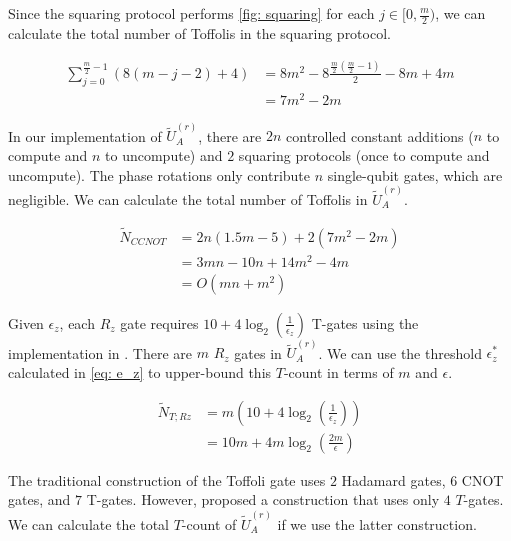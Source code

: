 Since the squaring protocol performs \ref{fig: squaring} for each $j \in [0, \frac{m}{2})$, we can calculate the total number of Toffolis in the squaring protocol.

\begin{equation}
    \begin{split}
        \sum_{j = 0}^{\frac{m}{2} - 1} (8(m - j - 2) + 4) &= 8m^2 - 8\frac{\frac{m}{2}(\frac{m}{2} - 1)}{2} - 8m + 4m \\
        &= 7m^2 - 2m
    \end{split}
\end{equation}

In our implementation of $\tilde{U}_A^{(r)}$, there are $2n$ controlled constant additions ($n$ to compute and $n$ to uncompute) and $2$ squaring protocols (once to compute and uncompute). The phase rotations only contribute $n$ single-qubit gates, which are negligible. We can calculate the total number of Toffolis in $\tilde{U}_A^{(r)}$.

\begin{equation}
    \begin{split}
        \tilde{N}_{CCNOT} &= 2n(1.5m - 5) + 2(7m^2 - 2m) \\
        &= 3mn - 10n + 14m^2 - 4m \\
        &= O(mn + m^2) \label{eq: toffolis}
    \end{split}
\end{equation}

Given $\epsilon_z$, each $R_z$ gate requires $10 + 4\log_2(\frac{1}{\epsilon_z})$ T-gates using the implementation in \cite{Rz}. There are $m$ $R_z$ gates in $\tilde{U}_A^{(r)}$. We can use the threshold $\epsilon_z^*$ calculated in \eqref{eq: e_z} to upper-bound this $T$-count in terms of $m$ and $\epsilon$.

\begin{equation}
    \begin{split}
        \tilde{N}_{T; Rz} &= m(10 + 4\log_2(\frac{1}{\epsilon_z})) \\
        &= 10m + 4m\log_2(\frac{2m}{\epsilon})
    \end{split}
\end{equation}

The traditional construction of the Toffoli gate uses $2$ Hadamard gates, $6$ CNOT gates, and $7$ T-gates. However, \cite{Toffoli} proposed a construction that uses only $4$ $T$-gates. We can calculate the total $T$-count of $\tilde{U}_A^{(r)}$ if we use the latter construction.

